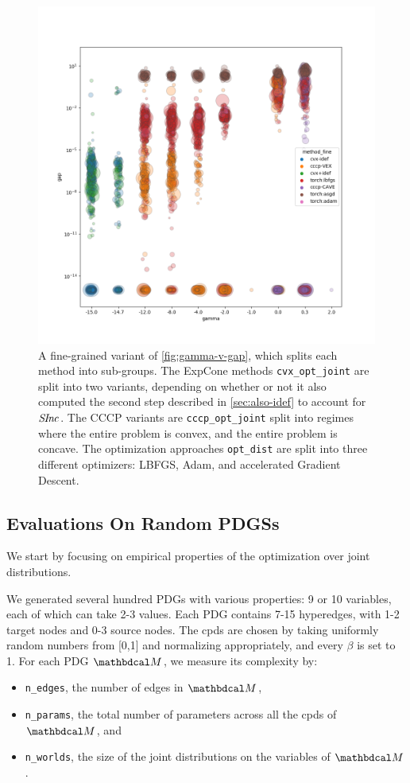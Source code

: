 \begin{figure}
    \includegraphics[width=\linewidth]{figs/2}
    \caption{
        A fine-grained variant of \cref{fig:gamma-v-gap}, which splits each method into sub-groups.
        The ExpCone methods \texttt{cvx\_opt\_joint} are split into two variants, depending on whether or not it also computed the second step described in \cref{sec:also-idef} to account for $\mathit{S\mskip-2.5muI\mskip-3.5mun\mskip-1.7muc}_{}$.
        The CCCP variants are \texttt{cccp\_opt\_joint} split into regimes where the entire problem is convex, and the entire problem is concave. The optimization approaches \texttt{opt\_dist} are split into three different optimizers: LBFGS, Adam, and accelerated Gradient Descent.
    }\label{fig:gamma-v-gap-fine}
\end{figure}


\subsection{Evaluations On Random PDGSs}
We start by focusing on empirical properties of the optimization over joint distributions.

We generated several hundred PDGs with various properties: 9 or 10 variables, each of which can take 2-3 values. Each PDG contains 7-15 hyperedges, with 1-2 target nodes and 0-3 source nodes. The cpds are chosen by taking uniformly random numbers from [0,1] and normalizing appropriately, and every $\beta$ is set to 1.
For each PDG $\dg M$, we measure its complexity by:
\begin{itemize}[nosep]
    \item \texttt{n\_edges}, the number of edges in $\dg M$,
    \item \texttt{n\_params}, the total number of parameters across all the cpds of $\dg M$, and
    \item \texttt{n\_worlds}, the size of the joint distributions on the variables of $\dg M$.
\end{itemize}



